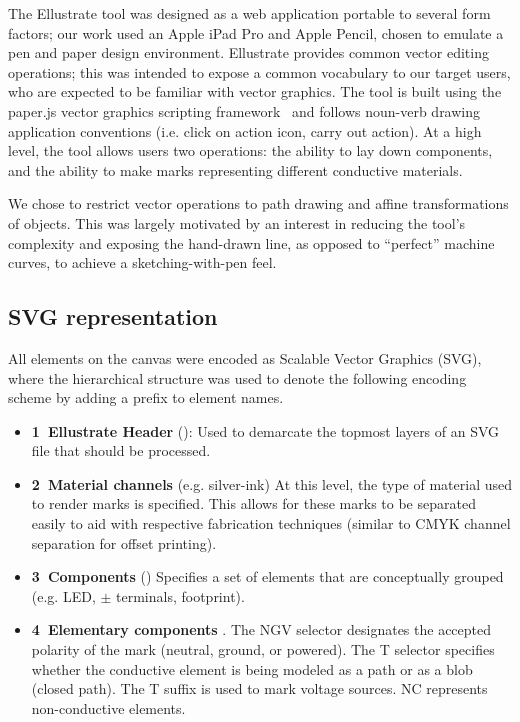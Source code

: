 \documentclass{sigchi}
\begin{document}
    The Ellustrate tool was designed as a web application portable to several form factors; our work used an Apple iPad Pro and Apple Pencil, chosen to emulate a pen and paper design environment. Ellustrate provides common vector editing operations; this was intended to expose a common vocabulary to our target users, who are expected to be familiar with vector graphics. The tool is built using the paper.js vector graphics scripting framework~\cite{lehni_paperjs_2011} and follows noun-verb drawing application conventions (i.e. click on action icon, carry out action). At a high level, the tool allows users two operations: the ability to lay down components, and the ability to make marks representing different conductive materials.

    We chose to restrict vector operations to path drawing and affine transformations of objects. This was largely motivated by an interest in reducing the tool's complexity and exposing the hand-drawn line, as opposed to ``perfect'' machine curves, to achieve a sketching-with-pen feel.

    \subsection{SVG representation}
    All elements on the canvas were encoded as Scalable Vector Graphics (SVG), where the hierarchical structure was used to denote the following encoding scheme by adding a prefix to element names.
    \begin{itemize}
        \item \textbf{1\degree~Ellustrate Header} (): Used to demarcate the topmost layers of an SVG file that should be processed.
        \item \textbf{2\degree~Material channels} (e.g.  silver-ink) At this level, the type of material used to render marks is specified. This allows for these marks to be separated easily to aid with respective fabrication techniques (similar to CMYK channel separation for offset printing).
        \item \textbf{3\degree~Components} () Specifies a set of elements that are conceptually grouped (e.g. LED, $\pm$ terminals, footprint).
        \item \textbf{4\degree~Elementary components} .
        The N\textbar G\textbar V selector designates the accepted polarity of the mark (neutral, ground, or powered). The T selector specifies whether the conductive element is being modeled as a path or as a blob (closed path). The T suffix is used to mark voltage sources. NC represents non-conductive elements.
    \end{itemize}
\end{document}
